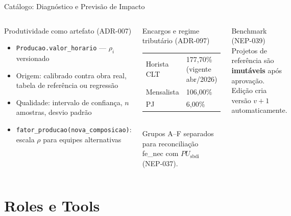 \documentclass[aspectratio=169,10pt]{beamer}
\begin{document}
\begin{frame}{Catálogo: Diagnóstico e Previsão de Impacto}
\begin{columns}[T]
    \begin{block}{Produtividade como artefato (ADR-007)}
      \begin{itemize}\scriptsize
        \item \texttt{Producao.valor\_horario} --- $\rho_i$ versionado
        \item Origem: calibrado contra obra real, tabela de referência ou regressão
        \item Qualidade: intervalo de confiança, $n$ amostras, desvio padrão
        \item \texttt{fator\_producao(nova\_composicao)}: escala $\rho$ para equipes alternativas
      \end{itemize}
    \end{block}
    \vspace{4pt}
    \begin{block}{Encargos e regime tributário (ADR-097)}
      \begin{tabular}{ll}\scriptsize
        Horista CLT  & 177{,}70\% \quad (vigente abr/2026) \\
        Mensalista   & 106{,}00\% \\
        PJ           & 6{,}00\% \\
      \end{tabular}\\[4pt]
      {\scriptsize Grupos A--F separados para reconciliação fe\_nec com $PU_{\text{sbdi}}$ (NEP-037).}
    \end{block}
    \vspace{4pt}
    \begin{alertblock}{\small Benchmark (NEP-039)}
      \scriptsize Projetos de referência são \textbf{imutáveis} após aprovação.
      Edição cria versão $v+1$ automaticamente.
    \end{alertblock}
  \end{columns}
\end{frame}

\section{Roles e Tools}
\end{document}
